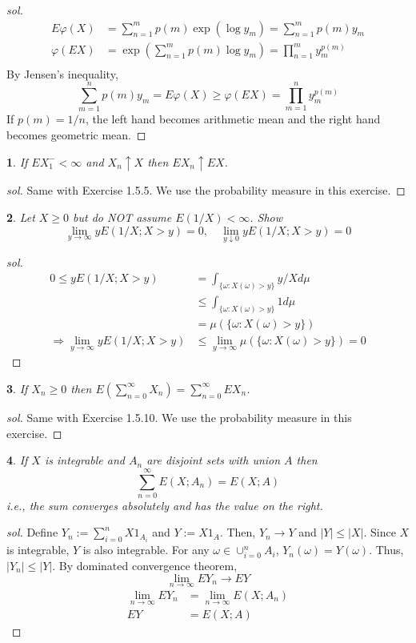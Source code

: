 \documentclass{report}
\newtheorem{ex}{}[section]
\begin{document}
\begin{proof}[sol]
\begin{align*}
E\varphi(X) &= \sum_{n=1}^m p(m) \exp(\log y_m) = \sum_{n=1}^m p(m)y_m\\
\varphi(EX) &= \exp(\sum_{n=1}^m p(m)\log y_m) = \prod_{n=1}^m y_m^{p(m)}\\
\end{align*}
By Jensen's inequality,
\[\sum_{m=1}^n p(m)y_m  = E\varphi(X) \ge \varphi(EX) = \prod_{m=1}^n y_m^{p(m)}\]
If $p(m) = 1/n$, the left hand becomes arithmetic mean and the right hand becomes geometric mean.
\end{proof}
\begin{ex}
If $EX_1^- <\infty$ and $X_n \uparrow X$ then $EX_n \uparrow EX$.
\end{ex}
\begin{proof}[sol]
Same with Exercise 1.5.5. We use the probability measure in this exercise.
\end{proof}
\begin{ex}
Let $X \ge 0 $ but do NOT assume $E(1/X) < \infty$. Show
\[\lim_{y\to\infty} yE(1/X; X>y) = 0,\quad \lim_{y\downarrow 0} yE(1/X; X>y) = 0\]
\end{ex}
\begin{proof}[sol]
\begin{align*}
    0 \le yE(1/X;X>y) &= \int_{\{\omega : X(\omega) > y\}} y/X d\mu\\
    &\le \int_{\{\omega : X(\omega) > y\}} 1d\mu\\
    &= \mu(\{\omega : X(\omega) > y\})\\
    \Rightarrow\lim_{y\to\infty} yE(1/X; X>y) &\le \lim_{y\to\infty}\mu(\{\omega : X(\omega) > y\}) = 0
\end{align*}
\end{proof}
\begin{ex}
If $X_n \ge 0$ then $E(\sum_{n=0}^\infty X_n) = \sum_{n=0}^\infty EX_n$.
\end{ex}
\begin{proof}[sol]
Same with Exercise 1.5.10.  We use the probability measure in this exercise.
\end{proof}
\begin{ex}
If $X$ is integrable and $A_n$ are disjoint sets with union $A$ then
\[\sum_{n=0}^\infty E(X; A_n) = E(X; A)\]
i.e., the sum converges absolutely and has the value on the right.
\end{ex}
\begin{proof}[sol]
Define $Y_n := \sum_{i=0}^n X1_{A_i}$ and $Y:= X1_A$. Then, $Y_n \to Y$ and $|Y| \le |X|$. Since $X$ is integrable, $Y$ is also integrable. For any $\omega \in \cup_{i=0}^n A_i$, $Y_n(\omega) = Y(\omega)$. Thus, $|Y_n| \le |Y|$. By dominated convergence theorem,
\[\lim_{n\to\infty} EY_n  \to EY \]
\begin{align*}
    \lim_{n\to\infty} EY_n &= \lim_{n\to\infty} E(X;A_n)\\
    EY &= E(X;A)
\end{align*}
\end{proof}
\end{document}
